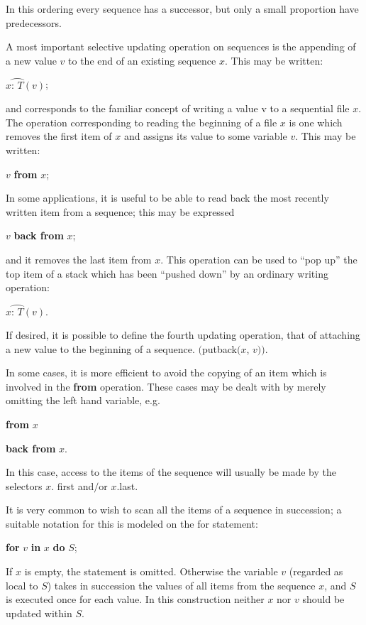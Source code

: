 \noindent
In this ordering every sequence has a successor, but only a small proportion have predecessors.

A most important selective updating operation on sequences is the appending of a new value $v$ to the end of an existing sequence $x$. This may be written:


\quad $x\wideparen{\text{: } T}(v)$;

\noindent
and corresponds to the familiar concept of writing a value v to a sequential file $x$. The operation corresponding to reading the beginning of a file $x$ is one which removes the first item of $x$ and assigns its value to some variable $v$. This may be written:

\quad $v$ \textbf{from} $x$;

\noindent
In some applications, it is useful to be able to read back the most recently written item from a sequence; this may be expressed

\quad $v$ \textbf{back from} $x$;

\noindent
and it removes the last item from $x$. This operation can be used to ``pop up'' the top item of a stack which has been ``pushed down'' by an ordinary writing operation:

\quad $x\wideparen{\text{: } T}(v).$

\noindent
If desired, it is possible to define the fourth updating operation, that of attaching a new value to the beginning of a sequence. $($putback$(x$, $v))$.

In some cases, it is more efficient to avoid the copying of an item which is involved in the \textbf{from} operation. These cases may be dealt with by merely omitting the left hand variable, e.g.

\quad \textbf{from} $x$

\quad \textbf{back from} $x$.

\noindent
In this case, access to the items of the sequence will usually be made by the selectors $x$. first and$/$or $x$.last.

It is very common to wish to scan all the items of a sequence in succession; a suitable notation for this is modeled on the for statement:

\quad \textbf{for} $v$ \textbf{in} $x$ \textbf{do} $S$;

\noindent
If $x$ is empty, the statement is omitted. Otherwise the variable $v$ (regarded as local to $S$) takes in succession the values of all items from the sequence $x$, and $S$ is executed once for each value. In this construction neither $x$ nor $v$ should be updated within $S$.

